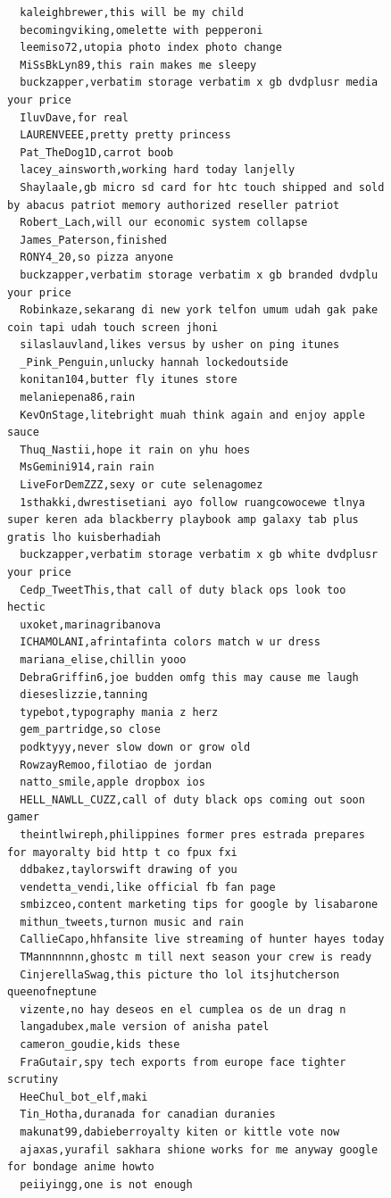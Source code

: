 \begin{figure}[htpb]
\begin{verbatim}
  kaleighbrewer,this will be my child
  becomingviking,omelette with pepperoni
  leemiso72,utopia photo index photo change
  MiSsBkLyn89,this rain makes me sleepy
  buckzapper,verbatim storage verbatim x gb dvdplusr media your price
  IluvDave,for real
  LAURENVEEE,pretty pretty princess
  Pat_TheDog1D,carrot boob
  lacey_ainsworth,working hard today lanjelly
  Shaylaale,gb micro sd card for htc touch shipped and sold by abacus patriot memory authorized reseller patriot
  Robert_Lach,will our economic system collapse
  James_Paterson,finished
  RONY4_20,so pizza anyone
  buckzapper,verbatim storage verbatim x gb branded dvdplu your price
  Robinkaze,sekarang di new york telfon umum udah gak pake coin tapi udah touch screen jhoni
  silaslauvland,likes versus by usher on ping itunes
  _Pink_Penguin,unlucky hannah lockedoutside
  konitan104,butter fly itunes store
  melaniepena86,rain
  KevOnStage,litebright muah think again and enjoy apple sauce
  Thuq_Nastii,hope it rain on yhu hoes
  MsGemini914,rain rain
  LiveForDemZZZ,sexy or cute selenagomez
  1sthakki,dwrestisetiani ayo follow ruangcowocewe tlnya super keren ada blackberry playbook amp galaxy tab plus gratis lho kuisberhadiah
  buckzapper,verbatim storage verbatim x gb white dvdplusr your price
  Cedp_TweetThis,that call of duty black ops look too hectic
  uxoket,marinagribanova
  ICHAMOLANI,afrintafinta colors match w ur dress
  mariana_elise,chillin yooo
  DebraGriffin6,joe budden omfg this may cause me laugh
  dieseslizzie,tanning
  typebot,typography mania z herz
  gem_partridge,so close
  podktyyy,never slow down or grow old
  RowzayRemoo,filotiao de jordan
  natto_smile,apple dropbox ios
  HELL_NAWLL_CUZZ,call of duty black ops coming out soon gamer
  theintlwireph,philippines former pres estrada prepares for mayoralty bid http t co fpux fxi
  ddbakez,taylorswift drawing of you
  vendetta_vendi,like official fb fan page
  smbizceo,content marketing tips for google by lisabarone
  mithun_tweets,turnon music and rain
  CallieCapo,hhfansite live streaming of hunter hayes today
  TMannnnnnn,ghostc m till next season your crew is ready
  CinjerellaSwag,this picture tho lol itsjhutcherson queenofneptune
  vizente,no hay deseos en el cumplea os de un drag n
  langadubex,male version of anisha patel
  cameron_goudie,kids these
  FraGutair,spy tech exports from europe face tighter scrutiny
  HeeChul_bot_elf,maki
  Tin_Hotha,duranada for canadian duranies
  makunat99,dabieberroyalty kiten or kittle vote now
  ajaxas,yurafil sakhara shione works for me anyway google for bondage anime howto
  peiiyingg,one is not enough

\end{verbatim}
\end{figure}
